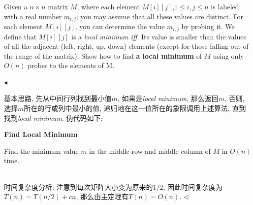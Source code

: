 \documentclass[11pt]{article}
\newenvironment{problem}[2][Problem]{\begin{trivlist}
\item[\hskip \labelsep{\bfseries#1}\hskip\labelsep{\bfseries#2.}]}{\hfill$\blacktriangleleft$\end{trivlist}}
\newenvironment{answer}[1][Answer]{\begin{trivlist}
\item[\hskip \labelsep{\bfseries\itshape#1.}\hskip \labelsep]}{\hfill$\lhd$\end{trivlist}}
\begin{document}
\begin{problem}{6 (Local Minima of A Chessboard)}
    Given a $n \times n$ matrix $M$, where each element $M[i][j]$,$1 \le i,j \le n$ 
    is labeled with a real number $m_{i,j}$; you may assume that 
    all these values are distinct. For each element $M[i][j]$, 
    you can determine the value $m_{i,j}$ by probing it. 
    We define that $M[i][j]$ is a \textit{local minimum iff}. 
    Its value is smaller than the values of all the adjacent 
    (left, right, up, down) elements (except for those falling out of the range of the matrix). 
    Show how to find \textbf{a local minimum} of $M$ using only $O(n)$ probes to the elements of M.
    
\end{problem}
\begin{answer}
    基本思路, 先从中间行列找到最小值$m$, 如果是\textit{local minimum}, 那么返回$m$, 
    否则, 选择$m$所在的行或列中最小的值, 递归地在这一值所在的象限调用上述算法, 直到找到\textit{local minimum}.
    伪代码如下:
    \begin{algorithm}
        \caption {\textbf{Find Local Minimum}}
        Find the minimum value $m$ in the middle row and middle column of $M$ in $O(n)$ time.\\
    \end{algorithm}
    \\时间复杂度分析: 注意到每次矩阵大小变为原来的$1/2$, 因此时间复杂度为$T(n) = T(n/2) + cn $, 那么由主定理有$ T(n) = O(n)$.
\end{answer}
    
\end{document}
